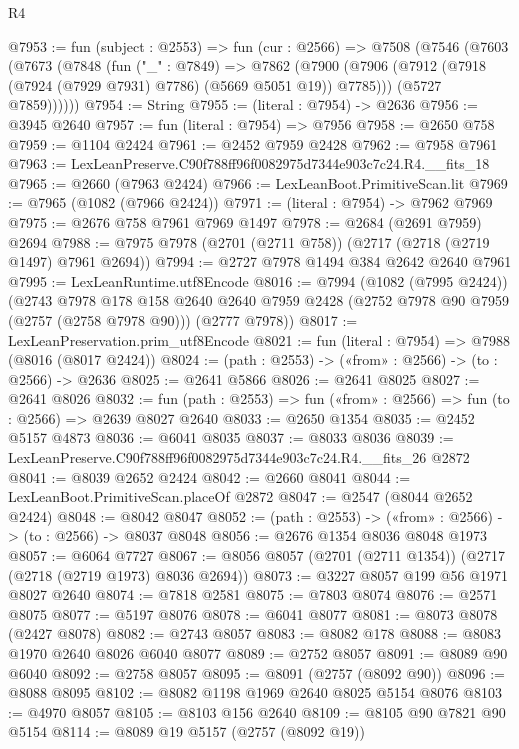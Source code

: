 \begin{lexlean}{R4}
\begin{coremodule}
@7953 := fun (subject : @2553) =>
  fun (cur : @2566) =>
  @7508
    (@7546
      (@7603
        (@7673
          (@7848
            (fun ("_" : @7849) =>
            @7862
              (@7900 (@7906 (@7912 (@7918 (@7924 (@7929 @7931) @7786) (@5669 @5051 @19)) @7785)))
              (@5727 @7859))))))
@7954 := String
@7955 := (literal : @7954) -> @2636
@7956 := @3945 @2640
@7957 := fun (literal : @7954) => @7956
@7958 := @2650 @758
@7959 := @1104 @2424
@7961 := @2452 @7959 @2428
@7962 := @7958 @7961
@7963 := LexLeanPreserve.C90f788ff96f0082975d7344e903c7c24.R4.__fits_18
@7965 := @2660 (@7963 @2424)
@7966 := LexLeanBoot.PrimitiveScan.lit
@7969 := @7965 (@1082 (@7966 @2424))
@7971 := (literal : @7954) -> @7962 @7969
@7975 := @2676 @758 @7961 @7969 @1497
@7978 := @2684 (@2691 @7959) @2694
@7988 := @7975 @7978 (@2701 (@2711 @758)) (@2717 (@2718 (@2719 @1497) @7961 @2694))
@7994 := @2727 @7978 @1494 @384 @2642 @2640 @7961
@7995 := LexLeanRuntime.utf8Encode
@8016 := @7994
    (@1082 (@7995 @2424))
    (@2743
      @7978
      @178
      @158
      @2640
      @2640
      @7959
      @2428
      (@2752 @7978 @90 @7959 (@2757 (@2758 @7978 @90)))
      (@2777 @7978))
@8017 := LexLeanPreservation.prim_utf8Encode
@8021 := fun (literal : @7954) => @7988 (@8016 (@8017 @2424))
@8024 := (path : @2553) -> («from» : @2566) -> (to : @2566) -> @2636
@8025 := @2641 @5866
@8026 := @2641 @8025
@8027 := @2641 @8026
@8032 := fun (path : @2553) => fun («from» : @2566) => fun (to : @2566) => @2639 @8027 @2640
@8033 := @2650 @1354
@8035 := @2452 @5157 @4873
@8036 := @6041 @8035
@8037 := @8033 @8036
@8039 := LexLeanPreserve.C90f788ff96f0082975d7344e903c7c24.R4.__fits_26 @2872
@8041 := @8039 @2652 @2424
@8042 := @2660 @8041
@8044 := LexLeanBoot.PrimitiveScan.placeOf @2872
@8047 := @2547 (@8044 @2652 @2424)
@8048 := @8042 @8047
@8052 := (path : @2553) -> («from» : @2566) -> (to : @2566) -> @8037 @8048
@8056 := @2676 @1354 @8036 @8048 @1973
@8057 := @6064 @7727
@8067 := @8056 @8057 (@2701 (@2711 @1354)) (@2717 (@2718 (@2719 @1973) @8036 @2694))
@8073 := @3227 @8057 @199 @56 @1971 @8027 @2640
@8074 := @7818 @2581
@8075 := @7803 @8074
@8076 := @2571 @8075
@8077 := @5197 @8076
@8078 := @6041 @8077
@8081 := @8073 @8078 (@2427 @8078)
@8082 := @2743 @8057
@8083 := @8082 @178
@8088 := @8083 @1970 @2640 @8026 @6040 @8077
@8089 := @2752 @8057
@8091 := @8089 @90 @6040
@8092 := @2758 @8057
@8095 := @8091 (@2757 (@8092 @90))
@8096 := @8088 @8095
@8102 := @8082 @1198 @1969 @2640 @8025 @5154 @8076
@8103 := @4970 @8057
@8105 := @8103 @156 @2640
@8109 := @8105 @90 @7821 @90 @5154
@8114 := @8089 @19 @5157 (@2757 (@8092 @19))

\end{coremodule}
\end{lexlean}
